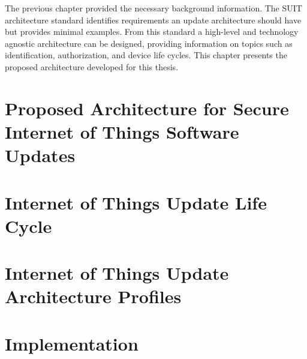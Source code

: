 \documentclass[0-thesis.tex]{subfiles}
\begin{document}
The previous chapter provided the necessary background information. The SUIT architecture
standard identifies requirements an update architecture should have but provides minimal
examples. From this standard a high-level and technology agnostic architecture can be
designed, providing information on topics such as identification, authorization, and
device life cycles. This chapter presents the proposed architecture developed for this
thesis.


\section{Proposed Architecture for Secure Internet of Things Software Updates}


\section{Internet of Things Update Life Cycle}


\section{Internet of Things Update Architecture Profiles}


\section{Implementation}

\end{document}
